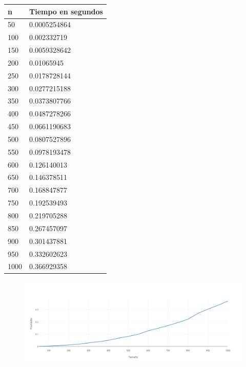 	\begin{table}[htb]
	\centering
	\begin{tabular}[c]{|l|l|}

		\hline
n & Tiempo en segundos\\
		\hline
50	&	0.0005254864\\
		\hline
100	&	0.002332719\\
		\hline
150	&	0.0059328642\\
		\hline
200	&	0.01065945\\
		\hline
250	&	0.0178728144\\
		\hline
300	&	0.0277215188\\
		\hline
350	&	0.0373807766\\
		\hline
400	&	0.0487278266\\
		\hline
450	&	0.0661190683\\
		\hline
500	&	0.0807527896\\
		\hline
550	&	0.0978193478\\
		\hline
600	&	0.126140013\\
		\hline
650	&	0.146378511\\
		\hline
700	&	0.168847877\\
		\hline
750	&	0.192539493\\
		\hline
800	&	0.219705288\\
		\hline
850	&	0.267457097\\
		\hline
900	&	0.301437881\\
		\hline
950	&	0.332602623\\
		\hline
1000	&	0.366929358\\
		\hline

	\end{tabular}
	\end{table}

  \begin{figure}[h!]
   \begin{center}
 	\includegraphics[scale=0.4]{imagenes/ej3/n2logn.png}
   \end{center}
 \end{figure}

